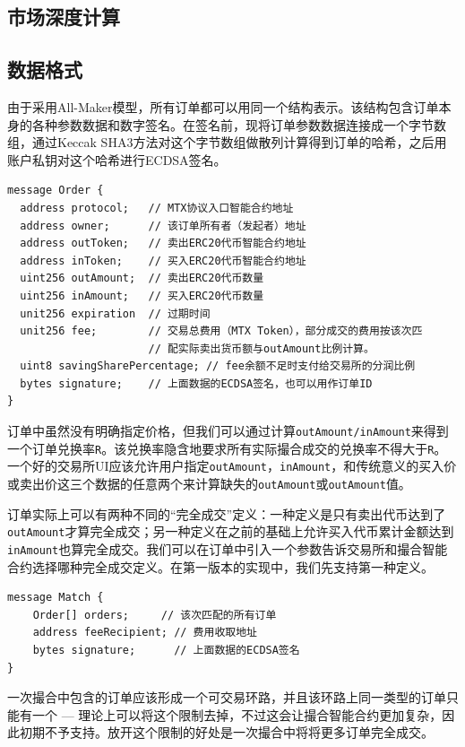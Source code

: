 \documentclass[UTF8,nofonts]{ctexart}
\begin{document}
\subsection{市场深度计算\label{sec:pricemodel}}

\subsection{数据格式\label{sec:dataformat}}

由于采用All-Maker模型，所有订单都可以用同一个结构表示。该结构包含订单本身的各种参数数据和数字签名。在签名前，现将订单参数数据连接成一个字节数组，通过Keccak SHA3方法对这个字节数组做散列计算得到订单的哈希，之后用账户私钥对这个哈希进行ECDSA签名。


\begin{verbatim}
message Order {
  address protocol;   // MTX协议入口智能合约地址
  address owner;      // 该订单所有者（发起者）地址
  address outToken;   // 卖出ERC20代币智能合约地址
  address inToken;    // 买入ERC20代币智能合约地址
  uint256 outAmount;  // 卖出ERC20代币数量
  uint256 inAmount;   // 买入ERC20代币数量
  unit256 expiration  // 过期时间
  unit256 fee;        // 交易总费用（MTX Token），部分成交的费用按该次匹
                      // 配实际卖出货币额与outAmount比例计算。
  uint8 savingSharePercentage; // fee余额不足时支付给交易所的分润比例
  bytes signature;    // 上面数据的ECDSA签名，也可以用作订单ID
}	
\end{verbatim}

订单中虽然没有明确指定价格，但我们可以通过计算\verb|outAmount/inAmount|来得到一个订单兑换率\verb|R|。该兑换率隐含地要求所有实际撮合成交的兑换率不得大于\verb|R|。一个好的交易所UI应该允许用户指定\verb|outAmount|，\verb|inAmount|，和传统意义的买入价或卖出价这三个数据的任意两个来计算缺失的\verb|outAmount|或\verb|outAmount|值。

订单实际上可以有两种不同的“完全成交”定义：一种定义是只有卖出代币达到了\verb|outAmount|才算完全成交；另一种定义在之前的基础上允许买入代币累计金额达到\verb|inAmount|也算完全成交。我们可以在订单中引入一个参数告诉交易所和撮合智能合约选择哪种完全成交定义。在第一版本的实现中，我们先支持第一种定义。

\begin{verbatim}
message Match {
    Order[] orders;     // 该次匹配的所有订单
    address feeRecipient; // 费用收取地址
    bytes signature;      // 上面数据的ECDSA签名
}
\end{verbatim}

一次撮合中包含的订单应该形成一个可交易环路，并且该环路上同一类型的订单只能有一个 --- 理论上可以将这个限制去掉，不过这会让撮合智能合约更加复杂，因此初期不予支持。放开这个限制的好处是一次撮合中将将更多订单完全成交。
\end{document}
